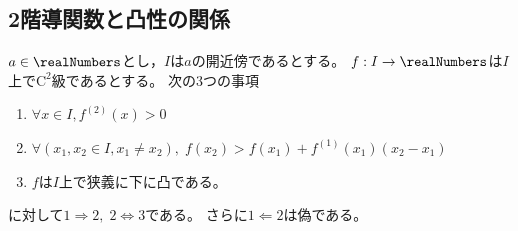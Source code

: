         \subsection{2階導関数と凸性の関係}
            \begin{shadebox}
                $a\in\realNumbers$とし，$I$は$a$の開近傍であるとする。
                $f:I\to\realNumbers$は$I$上で$\mathrm{C}^2$級であるとする。
                次の3つの事項
                \begin{enumerate}
                    \item $\forall x\in I, f^{(2)}(x) > 0$
                    \item $\forall (x_1,x_2\in I,x_1\neq x_2),\;f(x_2) > f(x_1) + f^{(1)}(x_1)(x_2-x_1)$
                    \item $f$は$I$上で狭義に下に凸である。
                \end{enumerate}
                に対して$1\Rightarrow 2,\;2\iff 3$である。
                さらに$1\Leftarrow 2$は偽である。
            \end{shadebox}
